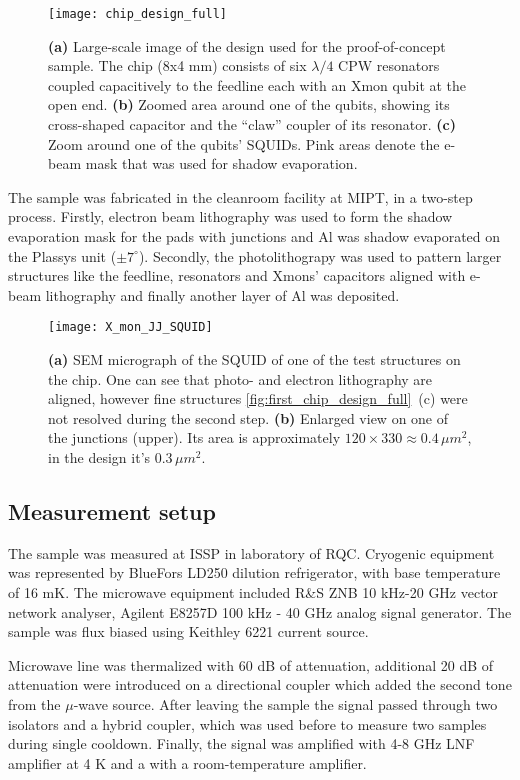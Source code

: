 \documentclass[12pt, twoside]{report}
\numberwithin{equation}{section}
\begin{document}
\begin{figure}[h!]
\centering
\texttt{[image: chip\_design\_full]}
\caption{\textbf{(a)} Large-scale image of the design used for the proof-of-concept sample. The chip (8x4 mm) consists of six $\lambda/4$ CPW resonators coupled capacitively to the feedline each with an Xmon qubit at the open end. \textbf{(b)} Zoomed area around one of the qubits, showing its cross-shaped capacitor and the ``claw'' coupler of its resonator. \textbf{(c)} Zoom around one of the qubits' SQUIDs. Pink areas denote the e-beam mask that was used for shadow evaporation.}
\label{fig:first_chip_design_full}
\end{figure}

The sample was fabricated in the cleanroom facility at MIPT, in a two-step process. Firstly, electron beam lithography was used to form the shadow evaporation mask for the pads with junctions and Al was shadow evaporated on the Plassys unit ($\pm 7^\circ$). Secondly, the photolithograpy was used to pattern larger structures like the feedline, resonators and Xmons' capacitors aligned with e-beam lithography and finally another layer of Al was deposited.	

\begin{figure}
\centering
\texttt{[image: X\_mon\_JJ\_SQUID]}
\caption{\textbf{(a)} SEM micrograph of the SQUID of one of the test structures on the chip. One can see that photo- and electron lithography are aligned, however fine structures \autoref{fig:first_chip_design_full}~(c) were not resolved during the second step. \textbf{(b)} Enlarged view on one of the junctions (upper). Its area is approximately $120\times 330\approx 0.4\, \mu m^2$, in the design it's $0.3\,\mu m^2$.} 
\end{figure}

\subsection{Measurement setup}

The sample was measured at ISSP in laboratory of RQC. Cryogenic equipment was represented by BlueFors LD250 dilution refrigerator, with base temperature of 16 mK. The microwave equipment included R\&S ZNB 10 kHz-20 GHz vector network analyser,  Agilent E8257D 100 kHz - 40 GHz analog signal generator. The sample was flux biased using Keithley 6221 current source.

Microwave line was thermalized with 60 dB of attenuation, additional 20 dB of attenuation were introduced on a directional coupler which added the second tone from the $\mu$-wave source. After leaving the sample the signal passed through two isolators and a hybrid coupler, which was used before to measure two samples during single cooldown. Finally, the signal was amplified with 4-8 GHz LNF amplifier at 4 K and a with a room-temperature amplifier.
\end{document}
